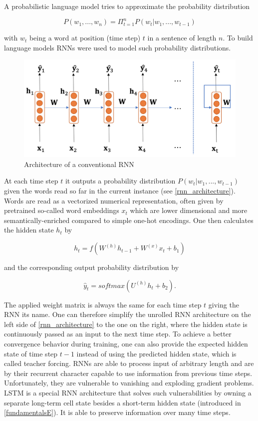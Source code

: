 A probabilistic language model tries to approximate the probability distribution 

\begin{equation}
	P(w_1, ..., w_n) = \Pi_{t=1}^{n} P(w_t | w_1, ..., w_{t-1})
\end{equation}

with $w_t$ being a word at position (time step) $t$ in a sentence of length $n$. To build language models \acp{RNN} were used to model such probability distributions. 

\begin{figure}[ht]
	\centering
	\includegraphics[width=0.6\linewidth]{figures/rnn_architecture.png}
	\caption{Architecture of a conventional \ac{RNN} \cite[p. 46]{Gertz2020}}
	\label{rnn_architecture}
\end{figure}

At each time step $t$ it outputs a probability distribution $P(w_t | w_1, ..., w_{t-1})$ given the words read so far in the current instance (see \autoref{rnn_architecture}). Words are read as a vectorized numerical representation, often given by pretrained so-called word embeddings $x_t$ which are lower dimensional and more semantically-enriched compared to simple one-hot encodings. One then calculates the hidden state $h_t$ by

\begin{equation}
	h_t = f(W^{(h)} h_{t-1} + W^{(x)} x_t + b_1)
\end{equation}

and the corresponding output probability distribution by 

\begin{equation}
	\hat{y}_t = softmax(U^{(h)} h_t + b_2).
\end{equation}

The applied weight matrix is always the same for each time step $t$ giving the \ac{RNN} its name. One can therefore simplify the unrolled \ac{RNN} architecture on the left side of \autoref{rnn_architecture} to the one on the right, where the hidden state is continuously passed as an input to the next time step. To achieve a better convergence behavior during training, one can also provide the expected hidden state of time step $t-1$ instead of using the predicted hidden state, which is called teacher forcing. \acp{RNN} are able to process input of arbitrary length and are by their recurrent character capable to use information from previous time steps. Unfortunately, they are vulnerable to vanishing and exploding gradient problems. \ac{LSTM} is a special \ac{RNN} architecture that solves such vulnerabilities by owning a separate long-term cell state besides a short-term hidden state (introduced in \autoref{fundamentalsE}). It is able to preserve information over many time steps. \cite{Gertz2020}

